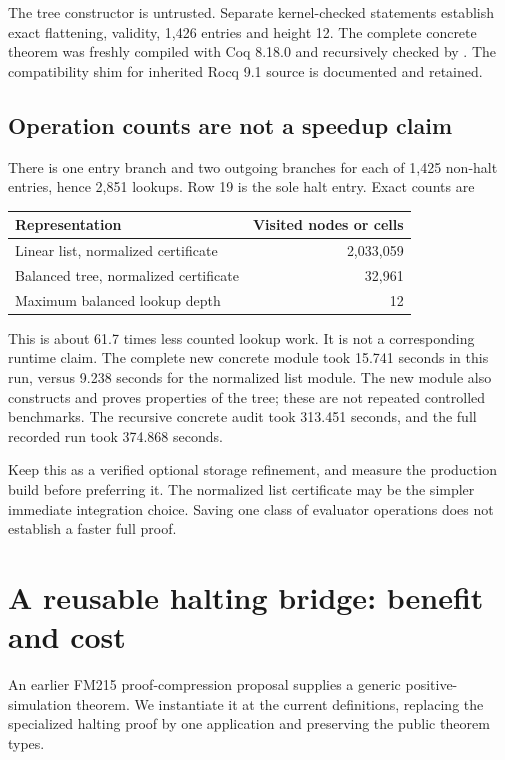 \documentclass[11pt]{article}
\theoremstyle{definition}\newtheorem{definition}[theorem]{Definition}
\newcommand{\code}[1]{\texttt{\detokenize{#1}}}
\begin{document}
The tree constructor is untrusted. Separate kernel-checked statements establish exact flattening, validity, 1,426 entries and height 12. The complete concrete theorem was freshly compiled with Coq 8.18.0 and recursively checked by \code{coqchk}. The compatibility shim for inherited Rocq 9.1 source is documented and retained.

\subsection{Operation counts are not a speedup claim}
There is one entry branch and two outgoing branches for each of 1,425 non-halt entries, hence 2,851 lookups. Row 19 is the sole halt entry. Exact counts are
\begin{center}
\begin{tabular}{lr}
\toprule
Representation & Visited nodes or cells\\
\midrule
Linear list, normalized certificate & 2,033,059\\
Balanced tree, normalized certificate & 32,961\\
Maximum balanced lookup depth & 12\\
\bottomrule
\end{tabular}
\end{center}
This is about 61.7 times less counted lookup work. It is not a corresponding runtime claim. The complete new concrete module took 15.741 seconds in this run, versus 9.238 seconds for the normalized list module. The new module also constructs and proves properties of the tree; these are not repeated controlled benchmarks. The recursive concrete audit took 313.451 seconds, and the full recorded run took 374.868 seconds.

Keep this as a verified optional storage refinement, and measure the production build before preferring it. The normalized list certificate may be the simpler immediate integration choice. Saving one class of evaluator operations does not establish a faster full proof.

\section{A reusable halting bridge: benefit and cost}
An earlier FM215 proof-compression proposal supplies a generic positive-simulation theorem. We instantiate it at the current \code{KSim} definitions, replacing the specialized halting proof by one application and preserving the public theorem types.
\end{document}
